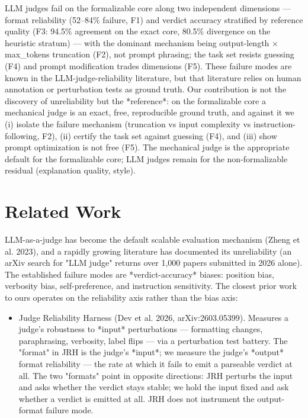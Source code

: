 \documentclass[10pt,twocolumn]{article}
\begin{document}
LLM judges fail on the formalizable core along two independent dimensions — format reliability (52–84\% failure, F1) and verdict accuracy stratified by reference quality (F3: 94.5\% agreement on the exact core, 80.5\% divergence on the heuristic stratum) — with the dominant mechanism being output-length × max\_tokens truncation (F2), not prompt phrasing; the task set resists guessing (F4) and prompt modification trades dimensions (F5). These failure modes are known in the LLM-judge-reliability literature, but that literature relies on human annotation or perturbation tests as ground truth. Our contribution is not the discovery of unreliability but the *reference*: on the formalizable core a mechanical judge is an exact, free, reproducible ground truth, and against it we (i) isolate the failure mechanism (truncation vs input complexity vs instruction-following, F2), (ii) certify the task set against guessing (F4), and (iii) show prompt optimization is not free (F5). The mechanical judge is the appropriate default for the formalizable core; LLM judges remain for the non-formalizable residual (explanation quality, style).

\section{Related Work}
LLM-as-a-judge has become the default scalable evaluation mechanism (Zheng et al. 2023), and a rapidly growing literature has documented its unreliability (an arXiv search for "LLM judge" returns over 1,000 papers submitted in 2026 alone). The established failure modes are *verdict-accuracy* biases: position bias, verbosity bias, self-preference, and instruction sensitivity. The closest prior work to ours operates on the reliability axis rather than the bias axis:


\begin{itemize}
  \item Judge Reliability Harness (Dev et al. 2026, arXiv:2603.05399). Measures a judge's robustness to *input* perturbations — formatting changes, paraphrasing, verbosity, label flips — via a perturbation test battery. The "format" in JRH is the judge's *input*; we measure the judge's *output* format reliability — the rate at which it fails to emit a parseable verdict at all. The two "formats" point in opposite directions: JRH perturbs the input and asks whether the verdict stays stable; we hold the input fixed and ask whether a verdict is emitted at all. JRH does not instrument the output-format failure mode.
\end{itemize}
\end{document}
